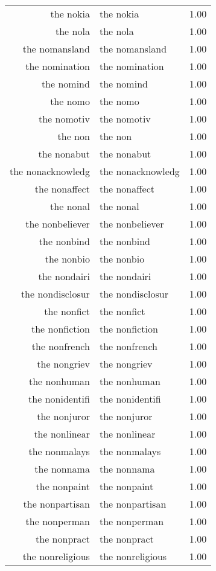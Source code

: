 \begin{table}[ht]
\begin{tabular}{rlr}
  the nokia & the nokia & 1.00 \\ 
  the nola & the nola & 1.00 \\ 
  the nomansland & the nomansland & 1.00 \\ 
  the nomination & the nomination & 1.00 \\ 
  the nomind & the nomind & 1.00 \\ 
  the nomo & the nomo & 1.00 \\ 
  the nomotiv & the nomotiv & 1.00 \\ 
  the non & the non & 1.00 \\ 
  the nonabut & the nonabut & 1.00 \\ 
  the nonacknowledg & the nonacknowledg & 1.00 \\ 
  the nonaffect & the nonaffect & 1.00 \\ 
  the nonal & the nonal & 1.00 \\ 
  the nonbeliever & the nonbeliever & 1.00 \\ 
  the nonbind & the nonbind & 1.00 \\ 
  the nonbio & the nonbio & 1.00 \\ 
  the nondairi & the nondairi & 1.00 \\ 
  the nondisclosur & the nondisclosur & 1.00 \\ 
  the nonfict & the nonfict & 1.00 \\ 
  the nonfiction & the nonfiction & 1.00 \\ 
  the nonfrench & the nonfrench & 1.00 \\ 
  the nongriev & the nongriev & 1.00 \\ 
  the nonhuman & the nonhuman & 1.00 \\ 
  the nonidentifi & the nonidentifi & 1.00 \\ 
  the nonjuror & the nonjuror & 1.00 \\ 
  the nonlinear & the nonlinear & 1.00 \\ 
  the nonmalays & the nonmalays & 1.00 \\ 
  the nonnama & the nonnama & 1.00 \\ 
  the nonpaint & the nonpaint & 1.00 \\ 
  the nonpartisan & the nonpartisan & 1.00 \\ 
  the nonperman & the nonperman & 1.00 \\ 
  the nonpract & the nonpract & 1.00 \\ 
  the nonreligious & the nonreligious & 1.00 \\ 

\end{tabular}
\end{table}
